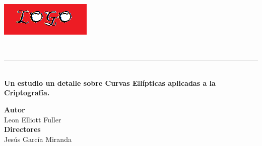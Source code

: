 \begin{titlepage}
 
 
    \setlength{\centeroffset}{-0.5\oddsidemargin}
    \addtolength{\centeroffset}{0.5\evensidemargin}
    \thispagestyle{empty}
    
    \noindent\hspace*{\centeroffset}\begin{minipage}{\textwidth}
    
    \centering
    
    
     \vspace{3.3cm}
    
    \includegraphics{imagenes/logo.png} 
     \vspace{0.5cm}
    
    
    {\Huge\bfseries \myTitle\\}
    \noindent\rule[-1ex]{\textwidth}{3pt}\\[3.5ex]
    {\large\bfseries Un estudio un detalle sobre Curvas Ellípticas aplicadas a la Criptografía.\\[4cm]}
    \end{minipage}
    
    \vspace{2.5cm}
    \noindent\hspace*{\centeroffset}\begin{minipage}{\textwidth}
    \centering
    
    \textbf{Autor}\\ {Leon Elliott Fuller}\\[2.5ex]
    \textbf{Directores}\\
    Jesús García Miranda\\[2cm]
    \end{minipage}
    
     
    \end{titlepage}
    
    
    